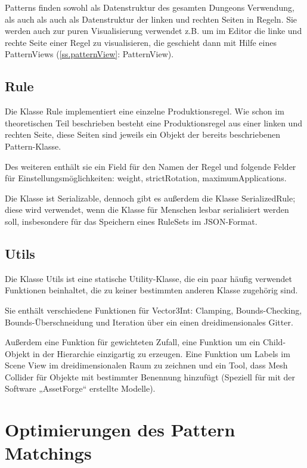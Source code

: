 Patterns finden sowohl als Datenstruktur des gesamten Dungeons Verwendung, als auch als auch als Datenstruktur der linken und rechten Seiten in Regeln. Sie werden auch zur puren Visualisierung verwendet z.B. um im Editor die linke und rechte Seite einer Regel zu visualisieren, die geschieht dann mit Hilfe eines PatternViews (\ref{ss.patternView}: PatternView).

\subsection{Rule}

Die Klasse Rule implementiert eine einzelne Produktionsregel. Wie schon im theoretischen Teil beschrieben besteht eine Produktionsregel aus einer linken und rechten Seite, diese Seiten sind jeweils ein Objekt der bereits beschriebenen Pattern-Klasse.

Des weiteren enthält sie ein Field für den Namen der Regel und folgende Felder für Einstellungsmöglichkeiten: weight, strictRotation, maximumApplications.

Die Klasse ist Serializable, dennoch gibt es außerdem die Klasse SerializedRule; diese wird verwendet, wenn die Klasse für Menschen lesbar serialisiert werden soll, insbesondere für das Speichern eines RuleSets im JSON-Format. 

\subsection{Utils}

Die Klasse Utils ist eine statische Utility-Klasse, die ein paar häufig verwendet Funktionen beinhaltet, die zu keiner bestimmten anderen Klasse zugehörig sind.

Sie enthält verschiedene Funktionen für Vector3Int: Clamping, Bounds-Checking, Bounds-Überschneidung und Iteration über ein einen dreidimensionales Gitter.

Außerdem eine Funktion für gewichteten Zufall, eine Funktion um ein Child-Objekt in der Hierarchie einzigartig zu erzeugen. Eine Funktion um Labels im Scene View im dreidimensionalen Raum zu zeichnen und ein Tool, dass Mesh Collider für Objekte mit bestimmter Benennung hinzufügt (Speziell für mit der Software „AssetForge“ erstellte Modelle).

\section{Optimierungen des Pattern Matchings}\label{s.optimierungen}

